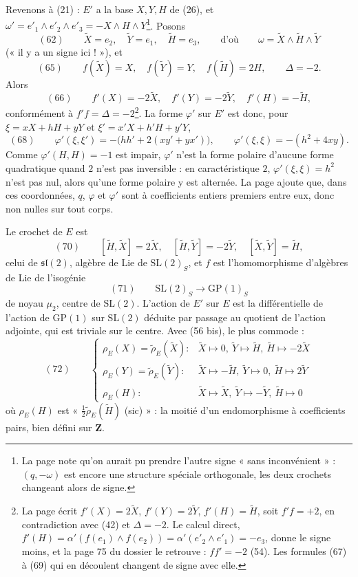 \documentclass[11pt,a4paper]{article}
\begin{document}
Revenons à (21) : $E'$ a la base $X, Y, H$ de (26), et
$\omega' = e'_1 \wedge e'_2 \wedge e'_3 = -X \wedge H \wedge Y$\footnote{La page note
qu'on aurait pu prendre l'autre signe « sans inconvénient » : $(q, -\omega)$ est
encore une structure spéciale orthogonale, les deux crochets changeant alors
de signe.}. Posons
\[
  (62) \qquad \widetilde{X} = e_2 , \quad \widetilde{Y} = e_1 , \quad \widetilde{H} = e_3 ,
  \qquad \text{d'où} \qquad \omega = \widetilde{X} \wedge \widetilde{H} \wedge \widetilde{Y}
\]
(« il y a un signe ici ! »), et
\[
  (65) \qquad f(\widetilde{X}) = X , \quad f(\widetilde{Y}) = Y , \quad f(\widetilde{H}) = 2H ,
  \qquad \Delta = -2 .
\]
Alors
\[
  (66) \qquad f'(X) = -2\widetilde{X} , \quad f'(Y) = -2\widetilde{Y} , \quad f'(H) = -\widetilde{H} ,
\]
conformément à $f'f = \Delta = -2$\footnote{La page écrit $f'(X) = 2\widetilde{X}$,
$f'(Y) = 2\widetilde{Y}$, $f'(H) = \widetilde{H}$, soit $f'f = +2$, en contradiction
avec (42) et $\Delta = -2$. Le calcul direct, $f'(H) = \alpha'(f(e_1) \wedge f(e_2)) =
\alpha'(e'_2 \wedge e'_1) = -e_3$, donne le signe moins, et la page 75 du dossier
le retrouve : $ff' = -2$ (54). Les formules (67) à (69) qui en découlent changent
de signe avec elle.}. La forme $\varphi'$ sur $E'$ est donc, pour
$\xi = xX + hH + yY$ et $\xi' = x'X + h'H + y'Y$,
\[
  (68) \qquad \varphi'(\xi, \xi') = -\bigl(hh' + 2(xy' + yx')\bigr) , \qquad
  \varphi'(\xi, \xi) = -(h^2 + 4xy) .
\]
Comme $\varphi'(H, H) = -1$ est impair, $\varphi'$ n'est la forme polaire d'aucune
forme quadratique quand $2$ n'est pas inversible : en caractéristique $2$,
$\varphi'(\xi, \xi) = h^2$ n'est pas nul, alors qu'une forme polaire y est alternée.
La page ajoute que, dans ces coordonnées, $q$, $\varphi$ et $\varphi'$ sont à
coefficients entiers premiers entre eux, donc non nulles sur tout corps.

Le crochet de $E$ est
\[
  (70) \qquad [\widetilde{H}, \widetilde{X}] = 2\widetilde{X} , \quad
  [\widetilde{H}, \widetilde{Y}] = -2\widetilde{Y} , \quad
  [\widetilde{X}, \widetilde{Y}] = \widetilde{H} ,
\]
celui de $\mathfrak{sl}(2)$, algèbre de Lie de $\mathrm{SL}(2)_S$, et $f$ est
l'homomorphisme d'algèbres de Lie de l'isogénie
\[
  (71) \qquad \mathrm{SL}(2)_S \longrightarrow \mathrm{GP}(1)_S
\]
de noyau $\mu_2$, centre de $\mathrm{SL}(2)$. L'action de $E'$ sur $E$ est la
différentielle de l'action de $\mathrm{GP}(1)$ sur $\mathrm{SL}(2)$ déduite par
passage au quotient de l'action adjointe, qui est triviale sur le centre. Avec
(56 bis), le plus commode :
\[
  (72) \qquad
  \begin{cases}
    \rho_E(X) = \tilde{\rho}_E(\widetilde{X}) : & \widetilde{X} \mapsto 0 ,\ \widetilde{Y} \mapsto \widetilde{H} ,\ \widetilde{H} \mapsto -2\widetilde{X} \\
    \rho_E(Y) = \tilde{\rho}_E(\widetilde{Y}) : & \widetilde{X} \mapsto -\widetilde{H} ,\ \widetilde{Y} \mapsto 0 ,\ \widetilde{H} \mapsto 2\widetilde{Y} \\
    \rho_E(H) : & \widetilde{X} \mapsto \widetilde{X} ,\ \widetilde{Y} \mapsto -\widetilde{Y} ,\ \widetilde{H} \mapsto 0
  \end{cases}
\]
où $\rho_E(H)$ est « $\tfrac{1}{2}\tilde{\rho}_E(\widetilde{H})$ (sic) » : la moitié d'un
endomorphisme à coefficients pairs, bien défini sur $\mathbf{Z}$.
\end{document}

